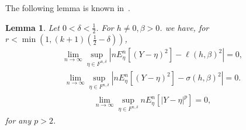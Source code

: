 \documentclass{amsart}
\newtheorem{lem}[thm]{Lemma}
\begin{document}
         The following lemma is known in~\cite{bierkens2017}. 
         \begin{lem}
         	\label{lem:moments}
         	Let $0<\delta<\frac12$. For $h\neq 0, \beta>0$. we have, for $r <\min(1, (k+1)(\frac12-\delta))$, 
		\begin{align*}
         		\lim_{n\rightarrow \infty} \sup_{\eta\in F^{n,\delta}} |nE_\eta^n[(Y-\eta)^2]-\ell(h,\beta)^2|=0,
		\end{align*}
         	\begin{align*}
         		\lim_{n\rightarrow \infty} \sup_{\eta\in F^{n,\delta}} |n E_\eta^n[(Y-\eta)^2]-\sigma(h,\beta)^2|=0.
         	\end{align*}
         	\begin{align*}
         		\lim_{n\rightarrow \infty} \sup_{\eta\in F^{n,\delta}} n E_\eta^n[|Y-\eta |^p]=0,
         	\end{align*}
	for any $p>2$.
         \end{lem}
\end{document}
